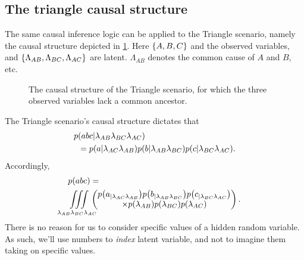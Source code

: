 \begin{EDITING...}
\section{The triangle causal structure}

The same causal inference logic can be applied to the Triangle scenario, namely the causal structure depicted in \cref{fig:TriDAG}. Here $\left\lbrace A,B,C\right\rbrace$ and the observed variables, and  $\left\lbrace\Lambda_{AB},\Lambda_{BC},\Lambda_{AC}\right\rbrace$ are latent. $\Lambda_{AB}$ denotes the common cause of $A$ and $B$, etc. 


\begin{figure}[!t]
\caption{The causal structure of the Triangle scenario, for which the three observed variables lack a common ancestor.}
 \label{fig:TriDAG}
\end{figure}


The Triangle scenario's causal structure dictates that
\begin{align}\begin{split}\label{eq:tristructure}
p&\parens{abc|\lambda_{AB}\lambda_{BC}\lambda_{AC}}\\
&=\p{a|\lambda_{AC}\lambda_{AB}}\p{b|\lambda_{AB}\lambda_{BC}}\p{c|\lambda_{BC}\lambda_{AC}}.
\end{split}\end{align}
Accordingly,
\begin{align}\label{eq:triintegration}
&\p{abc}=\\\nonumber
&\iiint\limits_{\mathclap{\lambda_{AB}\lambda_{BC}\lambda_{AC}}}\,
\begin{pmatrix}\p{a_{|\lambda_{AC}\lambda_{AB}}}\p{b_{|\lambda_{AB}\lambda_{BC}}}\p{c_{|\lambda_{BC}\lambda_{AC}}}\\
\times \p{\lambda_{AB}}\p{\lambda_{BC}}\p{\lambda_{AC}}\end{pmatrix}.
\end{align}
There is no reason for us to consider specific values of a hidden random variable. As such, we'll use numbers to \emph{index} latent variable, and not to imagine them taking on specific values.


\end{EDITING...}
